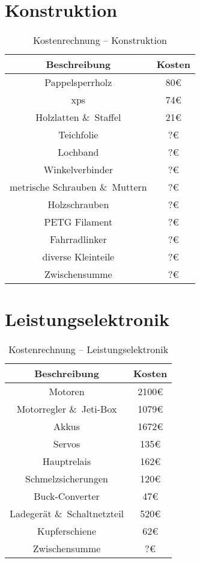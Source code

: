 \section{Konstruktion}
\begin{table}[H]
    \centering
    \begin{tabular}{|c|c|}
        \hline
        \textbf{Beschreibung} & \textbf{Kosten}\\\hline
        Pappelsperrholz & 80\euro\\
        \acs{xps} & 74\euro\\
        Holzlatten \&\ Staffel & 21\euro\\
        Teichfolie & ?\euro\\
        Lochband & ?\euro\\
        Winkelverbinder & ?\euro\\
        metrische Schrauben \&\ Muttern & ?\euro\\
        Holzschrauben & ?\euro\\
        PETG Filament & ?\euro\\
        Fahrradlinker & ?\euro\\
        diverse Kleinteile & ?\euro\\
        \hline
        Zwischensumme & ?\euro\\\hline
    \end{tabular}
    \caption{Kostenrechnung -- Konstruktion}
\end{table}

\section{Leistungselektronik}
\begin{table}[H]
    \centering
    \begin{tabular}{|c|c|}
        \hline
        \textbf{Beschreibung} & \textbf{Kosten}\\\hline
        Motoren & 2100\euro\\
        Motorregler \&\ Jeti-Box & 1079\euro\\
        Akkus & 1672\euro\\
        Servos & 135\euro\\
        Hauptrelais & 162\euro\\
        Schmelzsicherungen & 120\euro\\
        Buck-Converter & 47\euro\\
        Ladegerät \&\ Schaltnetzteil & 520\euro\\
        Kupferschiene & 62\euro\\
        \hline
        Zwischensumme & ?\euro\\\hline
    \end{tabular}
    \caption{Kostenrechnung -- Leistungselektronik}
\end{table}

